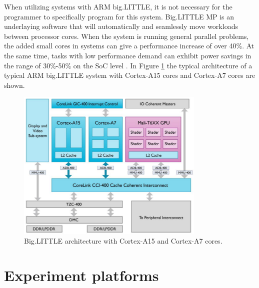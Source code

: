 When utilizing systems with ARM big.LITTLE, it is not necessary for the programmer to specifically program for this system.
Big.LITTLE MP is an underlaying software that will automatically and seamlessly move workloads between processor cores.
When the system is running general parallel problems, the added small cores in systems can give a performance increase of over 40\%.
At the same time, tasks with low performance demand can exhibit power savings in the range of 30\%-50\% on the SoC level \cite{jeff13}.
In Figure \ref{bigLITTLEarchitecture} the typical architecture of a typical ARM big.LITTLE system with Cortex-A15 cores and Cortex-A7 cores are shown.

\begin{figure}[ht!]
  \centering
  \includegraphics[width=90mm]{fig/biglittle.png}
  \caption{Big.LITTLE architecture with Cortex-A15 and Cortex-A7 cores. \label{bigLITTLEarchitecture}}
\end{figure}

\section{Experiment platforms}

